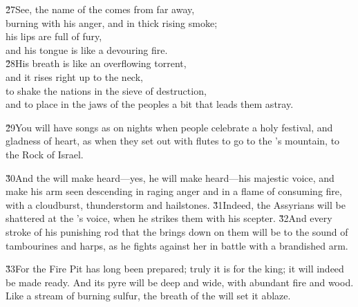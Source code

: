 \begin{poetry}
\poeml \v{27}See, the name of the  comes from far away, \\
\poemll    burning with his anger, and in thick rising smoke; \\
\poeml his lips are full of fury, \\
\poemll    and his tongue is like a devouring fire. \\
\poeml \v{28}His breath is like an overflowing torrent, \\
\poemll    and it rises right up to the neck, \\
\poeml to shake the nations in the sieve of destruction, \\
\poemll    and to place in the jaws of the peoples a bit that leads them astray.
\end{poetry}

\v{29}You will have songs as on nights when people celebrate a holy festival, and gladness of heart, as when they set out with flutes to go to the 's mountain, to the Rock of Israel.

\v{30}And the  will make heard---yes, he will make heard---his majestic voice, and make his arm seen descending in raging anger and in a flame of consuming fire, with a cloudburst, thunderstorm and hailstones. \v{31}Indeed, the Assyrians will be shattered at the 's voice, when he strikes them with his scepter. \v{32}And every stroke of his punishing rod that the  brings down on them will be to the sound of tambourines and harps, as he fights against her in battle with a brandished arm.

\v{33}For the Fire Pit has long been prepared; truly it is for the king; it will indeed be made ready. And its pyre will be deep and wide, with abundant fire and wood. Like a stream of burning sulfur, the breath of the  will set it ablaze.

